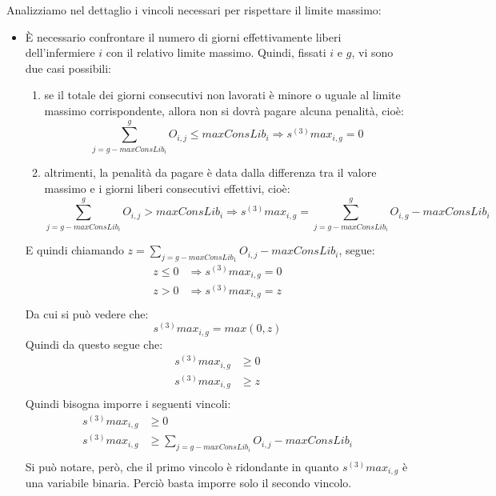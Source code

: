 Analizziamo nel dettaglio i vincoli necessari per rispettare il limite massimo:
\begin{itemize}
\item È necessario confrontare il numero di giorni effettivamente liberi dell'infermiere $i$ con il relativo limite massimo. Quindi, fissati $i$ e $g$, vi sono due casi possibili:
\begin{enumerate}
\item se il totale dei giorni consecutivi non lavorati è minore o uguale al limite massimo corrispondente, allora non si dovrà pagare alcuna penalità, cioè:
\begin{equation}
\sum_{j=g-maxConsLib_i}^g O_{i, j} \leq maxConsLib_i \Longrightarrow s^{(3)}max_{i, g} = 0
\end{equation}
\item altrimenti, la penalità da pagare è data dalla differenza tra il valore massimo e i giorni liberi consecutivi effettivi, cioè:
\begin{equation}
\sum_{j=g-maxConsLib_i}^g O_{i, j} > maxConsLib_i \Longrightarrow s^{(3)}max_{i, g} = \sum_{j=g-maxConsLib_i}^g O_{i, g} - maxConsLib_i
\end{equation}
\end{enumerate}
E quindi chiamando $z = \sum_{j=g - maxConsLib_1} O_{i, j} - maxConsLib_i$, segue:
\begin{equation}
\begin{split}
z \leq 0 &\Longrightarrow s^{(3)}max_{i, g} = 0\\
z > 0 &\Longrightarrow s^{(3)}max_{i, g} = z\\
\end{split}
\end{equation}
Da cui si può vedere che:
\begin{equation}
s^{(3)}max_{i, g} = max(0, z)
\end{equation}
Quindi da questo segue che:
\begin{equation}
\begin{split}
s^{(3)}max_{i, g} &\geq 0\\
s^{(3)}max_{i, g} &\geq z\\
\end{split}
\end{equation}
Quindi bisogna imporre i seguenti vincoli:
\begin{equation}
\begin{split}
s^{(3)}max_{i, g} &\geq 0\\
s^{(3)}max_{i, g} &\geq \sum_{j=g-maxConsLib_i} O_{i, j} - maxConsLib_i\\
\end{split}
\end{equation}
Si può notare, però, che il primo vincolo è ridondante in quanto $s^{(3)}max_{i, g}$ è una variabile binaria. Perciò basta imporre solo il secondo vincolo.


\end{itemize}

